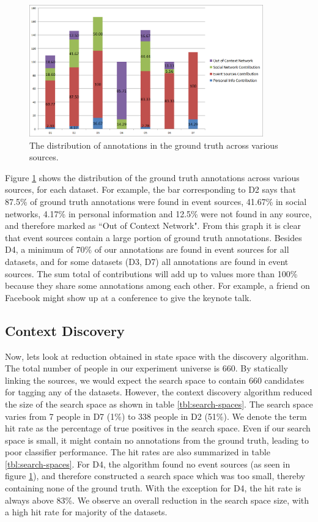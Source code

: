 \begin{figure}[t]
\centering
\includegraphics[width=0.9\textwidth]{media/gt-distro-stacked-2.png}
\caption{The distribution of annotations in the ground truth across various sources.}
\label{fig:src-cand-distribution}
\end{figure}

Figure \ref{fig:src-cand-distribution} shows the distribution of the ground truth annotations across various sources, for each dataset. For example, the bar corresponding to D2 says that 87.5\% of ground truth annotations were found in event sources, 41.67\% in social networks, 4.17\% in personal information and 12.5\% were not found in any source, and therefore marked as ``Out of Context Network". From this graph it is clear that event sources contain a large portion of ground truth annotations. Besides D4, a minimum of 70\% of our annotations are found in event sources for all datasets, and for some datasets (D3, D7) all annotations are found in event sources. The sum total of contributions will add up to values more than 100\% because they share some annotations among each other. For example, a friend on Facebook might show up at a conference to give the keynote talk.

\subsection{Context Discovery}
Now, lets look at reduction obtained in state space with the discovery algorithm. The total number of people in our experiment universe is 660. By statically linking the sources, we would expect the search space to contain 660 candidates for tagging any of the datasets. However, the context discovery algorithm reduced the size of the search space as shown in table \ref{tbl:search-spaces}. The search space varies from 7 people in D7 (1\%) to 338 people in D2 (51\%). We denote the term hit rate as the percentage of true positives in the search space. Even if our search space is small, it might contain no annotations from the ground truth, leading to poor classifier performance. The hit rates are also summarized in table \ref{tbl:search-spaces}. For D4, the algorithm found no event sources (as seen in figure \ref{fig:src-cand-distribution}), and therefore constructed a search space which was too small, thereby containing none of the ground truth. With the exception for D4, the hit rate is always above 83\%. We observe an overall reduction in the search space size, with a high hit rate for majority of the datasets. 

